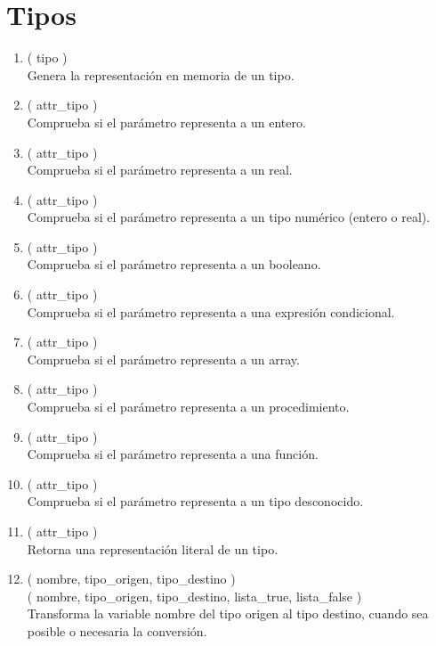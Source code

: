 \section{Tipos}

\begin{enumerate}

	\item {} ( tipo ) \\
			Genera la representación en memoria de un tipo.

	\item {} ( attr\_tipo ) \\
			Comprueba si el parámetro representa a un entero.
			
	\item {} ( attr\_tipo ) \\
			Comprueba si el parámetro representa a un real.

	\item {} ( attr\_tipo ) \\
			Comprueba si el parámetro representa a un tipo numérico (entero o real).

	\item {} ( attr\_tipo ) \\
			Comprueba si el parámetro representa a un booleano.

	\item {} ( attr\_tipo ) \\
			Comprueba si el parámetro representa a una expresión condicional.

	\item {} ( attr\_tipo ) \\
			Comprueba si el parámetro representa a un array.

	\item {} ( attr\_tipo ) \\
			Comprueba si el parámetro representa a un procedimiento.

	\item {} ( attr\_tipo ) \\
			Comprueba si el parámetro representa a una función.

	\item {} ( attr\_tipo ) \\
			Comprueba si el parámetro representa a un tipo desconocido.
		
	\item {} ( attr\_tipo ) \\
			Retorna una representación literal de un tipo.
			
	\item {} ( nombre, tipo\_origen, tipo\_destino ) \\
		   ( nombre, tipo\_origen, tipo\_destino, lista\_true, lista\_false ) \\	
			Transforma la variable nombre del tipo origen al tipo destino, cuando sea posible o necesaria la conversión.

\end{enumerate}

